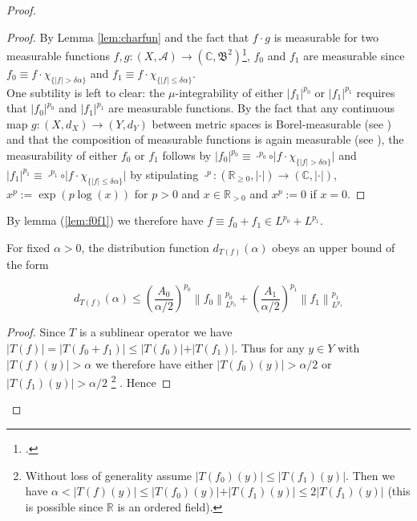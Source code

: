 \begin{proof}
\begin{proof}
	By Lemma \ref{lem:charfun} and the fact that $f \cdot g$ is measurable for two measurable functions $f,g: (X,\mathcal{A}) \rightarrow (\mathbb{C},\mathfrak{B}^2)$\footcite[107]{elstrodt:mass:2011}, $f_0$ and $f_1$ are measurable since $f_0 \equiv f \cdot \chi_{\{\vert f \vert > \delta \alpha\}}$ and $f_1 \equiv f \cdot \chi_{\{\vert f \vert \leqslant \delta \alpha\}}$.\\

	One subtility is left to clear: the $\mu$-integrability of either $\vert f_1\vert^{p_0}$ or $\vert f_1 \vert^{p_1}$ requires that $\vert f_0 \vert^{p_0}$ and $\vert f_1 \vert^{p_1}$ are measurable functions. By the fact that any continuous map $g: (X,d_X) \rightarrow (Y,d_Y)$ between metric spaces is Borel-measurable (see \cite[86]{elstrodt:mass:2011}) and that the composition of measurable functions is again measurable (see \cite[87]{elstrodt:mass:2011}), the measurability of either $f_0$ or $f_1$ follows by $\vert f_0 \vert^{p_0} \equiv \cdot^{p_0} \circ \vert f \cdot \chi_{\{\vert f\vert > \delta\alpha\}}\vert$ and $\vert f_1 \vert^{p_1} \equiv \cdot^{p_1} \circ \vert f \cdot \chi_{\{\vert f \vert \leqslant \delta \alpha\}}\vert$ by stipulating $\cdot^{p}: (\mathbb{R}_{\geqslant 0},\vert \cdot \vert) \rightarrow (\mathbb{C},\vert \cdot \vert)$, $x^{p} := \exp(p \log(x))$ for $p > 0$ and $x \in \mathbb{R}_{> 0}$ and $x^p := 0$ if $x = 0$.
\end{proof}

By lemma (\ref{lem:f0f1}) we therefore have $f \equiv f_0 + f_1 \in L^{p_0} + L^{p_1}$. 

\begin{lemma}
	For fixed $\alpha > 0$, the distribution function $d_{T(f)}(\alpha)$ obeys an upper bound of the form

	\begin{equation*}
		d_{T(f)}(\alpha) \leqslant  \left(\frac{A_0}{\alpha/2}\right)^{p_0} \left\|f_0\right\|^{p_0}_{L^{p_0}} + \left(\frac{A_1}{\alpha/2}\right)^{p_1} \left\|f_1\right\|^{p_1}_{L^{p_1}}
	\end{equation*}
\end{lemma}

\begin{proof}
Since $T$ is a sublinear operator we have $\vert T(f) \vert = \vert T(f_0 + f_1) \vert \leqslant \vert T(f_0) \vert + \vert T(f_1)\vert$. Thus for any $y \in Y$ with $\vert T(f)(y) \vert > \alpha$ we therefore have either $\vert T(f_0)(y) \vert > \alpha/2$ or $\vert T(f_1)(y) \vert > \alpha/2$ 
		\footnote{Without loss of generality assume $\vert T(f_0)(y) \vert \leqslant \vert T(f_1)(y) \vert $. Then we have $\alpha < \vert T(f)(y)\vert \leqslant \vert T(f_0)(y) \vert + \vert T(f_1)(y)\vert \leqslant 2\vert T(f_1)(y)\vert$ (this is possible since $\mathbb{R}$ is an ordered field).}
		. Hence


\end{proof}
\end{proof}

